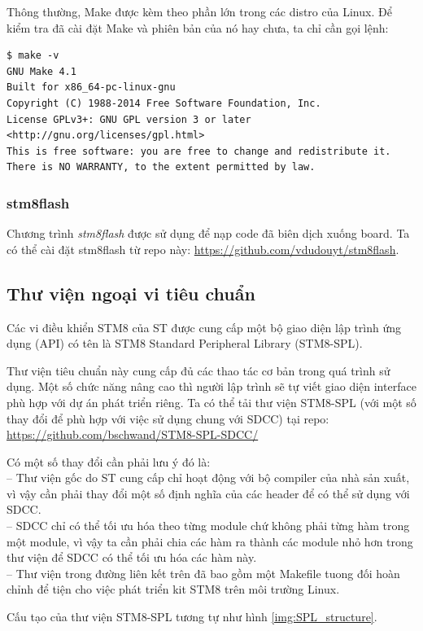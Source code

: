 Thông thường, Make được kèm theo phần lớn trong các distro của Linux.
Để kiểm tra đã cài đặt Make và phiên bản của nó hay chưa, ta chỉ cần gọi lệnh:
\begin{verbatim}
$ make -v
GNU Make 4.1
Built for x86_64-pc-linux-gnu
Copyright (C) 1988-2014 Free Software Foundation, Inc.
License GPLv3+: GNU GPL version 3 or later <http://gnu.org/licenses/gpl.html>
This is free software: you are free to change and redistribute it.
There is NO WARRANTY, to the extent permitted by law.
\end{verbatim}

\subsubsection{stm8flash}
Chương trình \emph{stm8flash} được sử dụng để nạp code đã biên dịch xuống board.
Ta có thể cài đặt stm8flash từ repo này: \url{https://github.com/vdudouyt/stm8flash}.

\subsection{Thư viện ngoại vi tiêu chuẩn}
Các vi điều khiển STM8 của ST được cung cấp một bộ giao diện lập trình ứng dụng (API) có tên là STM8 Standard Peripheral Library (STM8-SPL).

Thư viện tiêu chuẩn này cung cấp đủ các thao tác cơ bản trong quá trình sử dụng.
Một số chức năng nâng cao thì người lập trình sẽ tự viết giao diện interface phù hợp với dự án phát triển riêng.
Ta có thể tải thư viện STM8-SPL (với một số thay đổi để phù hợp với việc sử dụng chung với SDCC) tại repo: \url{https://github.com/bschwand/STM8-SPL-SDCC/}

Có một số thay đổi cần phải lưu ý đó là:\\
-- Thư viện gốc do ST cung cấp chỉ hoạt động với bộ compiler của nhà sản xuất, vì vậy cần phải thay đổi một số định nghĩa của các header để có thể sử dụng với SDCC.\\
-- SDCC chỉ có thể tối ưu hóa theo từng module chứ không phải từng hàm trong một module, vì vậy ta cần phải chia các hàm ra thành các module nhỏ hơn trong thư viện để SDCC có thể tối ưu hóa các hàm này.\\
-- Thư viện trong đường liên kết trên đã bao gồm một Makefile tuong đối hoàn chỉnh để tiện cho việc phát triển kit STM8 trên môi trường Linux.

Cấu tạo của thư viện STM8-SPL tương tự như hình \ref{img:SPL_structure}.

